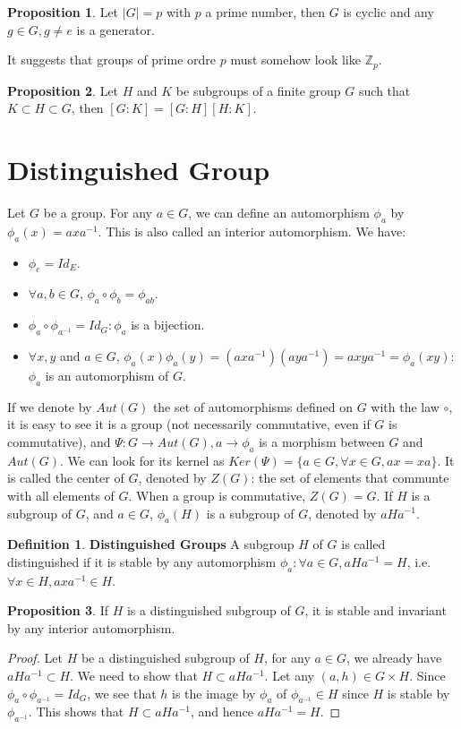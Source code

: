 \documentclass{article}
\theoremstyle{definition}
\newtheorem{defi}{Definition}[subsection]
\newtheorem{prop}{Proposition}[subsection]
\begin{document}
\begin{prop}
Let $|G|=p$ with $p$ a prime number, then $G$ is cyclic and any $g\in G, g\neq e$ is a generator.

It suggests that groups of prime ordre $p$ must somehow look like $\mathbb{Z}_p$.
\end{prop}

\begin{prop}
Let $H$ and $K$ be subgroups of a finite group $G$ such that $K\subset H \subset G$, then $[G:K]=[G:H][H:K]$.
\end{prop}

\section{Distinguished Group}

Let $G$ be a group. For any $a\in G$, we can define an automorphism $\phi_a$ by $\phi_a(x)=axa^{-1}$. This is also called an interior automorphism. We have: 
\begin{itemize}
    \item $\phi_e=Id_{E}$.
    \item $\forall a,b \in G$, $\phi_a \circ \phi_b=\phi_{ab}$.
    \item $\phi_a\circ \phi_{a^{-1}} = Id_{G}: \phi_a$ is a bijection.
    \item $\forall x,y$ and $a\in G$, $\phi_a(x)\phi_a(y)=(axa^{-1})(aya^{-1})=axya^{-1}=\phi_a(xy)$: $\phi_a$ is an automorphism of $G$.
\end{itemize}

If we denote by $Aut(G)$ the set of automorphisms defined on $G$ with the law $\circ$, it is easy to see it is a group (not necessarily commutative, even if $G$ is commutative), and $\Psi: G\to Aut(G), a\to \phi_a$ is a morphism between $G$ and $Aut(G)$. We can look for its kernel as $Ker(\Psi)=\{a \in G, \forall x\in G, ax=xa\}$. It is called the center of $G$, denoted by $Z(G)$: the set of elements that communte with all elements of $G$. When a group is commutative, $Z(G)=G$. If $H$ is a subgroup of $G$, and $a\in G$, $\phi_a(H)$ is a subgroup of $G$, denoted by $aHa^{-1}$. 

\begin{defi}
\textbf{Distinguished Groups} A subgroup $H$ of $G$ is called distinguished if it is stable by any automorphism $\phi_a: \forall a\in G, aHa^{-1}=H$, i.e. $\forall x\in H, axa^{-1}\in H$.
\end{defi}

\begin{prop}
If $H$ is a distinguished subgroup of $G$, it is stable and invariant by any interior automorphism.
\begin{proof}
Let $H$ be a distinguished subgroup of $H$, for any $a\in G$, we already have $aHa^{-1}\subset H$. We need to show that $H\subset aHa^{-1}$.
Let any $(a,h)\in G\times H$. Since $\phi_a\circ \phi_{a^{-1}}=Id_{G}$, we see that $h$ is the image by $\phi_a$ of $\phi_{a^{-1}}\in H$ since $H$ is stable by $\phi_{a^{-1}}$. This shows that $H\subset aHa^{-1}$, and hence $aHa^{-1}=H$.
\end{proof}
\end{prop}
\end{document}
